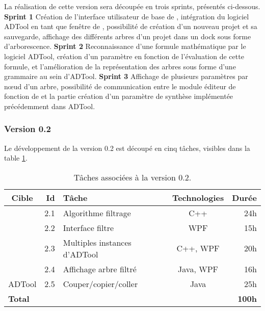 			
			La réalisation de cette version sera découpée en trois sprints, présentés ci-dessous.\newline
			\textbf{Sprint 1} Création de l'interface utilisateur de base de \glasir{}, intégration du logiciel ADTool en tant que fenêtre de \glasir{}, possibilité de création d'un nouveau projet et sa sauvegarde, affichage des différents arbres d'un projet dans un dock sous forme d'arborescence.\newline
			\textbf{Sprint 2} Reconnaissance d'une formule mathématique par le logiciel ADTool, création d'un paramètre en fonction de l'évaluation de cette formule, et l'amélioration de la représentation des arbres sous forme d'une grammaire au sein d'ADTool.\newline
			\textbf{Sprint 3} Affichage de plusieurs paramètres par nœud d'un arbre, possibilité de communication entre le module éditeur de fonction de \glasir{} et la partie création d'un paramètre de synthèse implémentée précédemment dans ADTool.\newline


		\subsubsection{Version 0.2}
			Le développement de la version 0.2 est découpé en cinq tâches, visibles dans la {\sc table} \ref{tab:taches_units_2}.
			\begin{table}[h]
				\centering
				\begin{tabular}{|c|r|l|c|r|}
					\hline
					\textbf{Cible} & \textbf{Id} & \textbf{Tâche} & \textbf{Technologies} & \textbf{Durée}\\
					\hline

					\multirow{4}{*}{\glasir{}} & 2.1 & Algorithme filtrage & C++ & 24h\\
					\cline{2-5}
					 & 2.2 & Interface filtre & WPF & 15h\\
					\cline{2-5}
					 & 2.3 & Multiples instances d'ADTool & C++, WPF & 20h\\
					\cline{2-5}
					 & 2.4 & Affichage arbre filtré & Java, WPF & 16h\\
					\hline

					\multirow{1}{*}{ADTool} & 2.5 & Couper/copier/coller & \multirow{1}{*}{Java} & 25h\\
					\hline

					\multicolumn{4}{|l|}{\bf Total} & {\bf 100h}\\
					\hline
				\end{tabular}
				\caption{Tâches associées à la version 0.2.}
				\label{tab:taches_units_2}
			\end{table}
			

